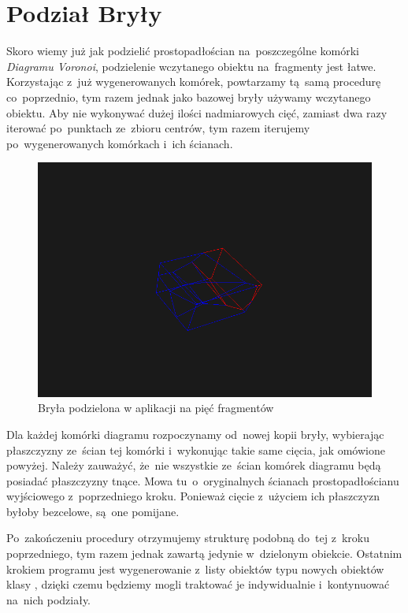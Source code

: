 \documentclass[skorowidz,autorrok,backref,xodstep,oswiadczenie]{wmimgr}
\begin{document}
\section{Podział Bryły}

Skoro wiemy już jak podzielić prostopadłościan na~poszczególne komórki \emph{Diagramu Voronoi}, podzielenie wczytanego obiektu na~fragmenty jest łatwe. Korzystając z~już wygenerowanych komórek, powtarzamy tą~samą procedurę co~poprzednio, tym razem jednak jako bazowej bryły używamy wczytanego obiektu. Aby nie wykonywać dużej ilości nadmiarowych cięć, zamiast dwa razy iterować po~punktach ze~zbioru centrów, tym razem iterujemy po~wygenerowanych komórkach i~ich ścianach.

\begin{figure}[ht!]
\centering
\includegraphics[width=140mm]{images/app3.png}
\caption{Bryła podzielona w aplikacji na pięć fragmentów}
\label{newpointposition}
\end{figure}

Dla każdej komórki diagramu rozpoczynamy od~nowej kopii bryły, wybierając płaszczyzny ze~ścian tej komórki i~wykonując takie same cięcia, jak omówione powyżej. Należy zauważyć, że~nie wszystkie ze~ścian komórek diagramu będą posiadać płaszczyzny tnące. Mowa tu~o~oryginalnych ścianach prostopadłościanu wyjściowego z~poprzedniego kroku. Ponieważ cięcie z~użyciem ich płaszczyzn byłoby bezcelowe, są~one pomijane.

Po~zakończeniu procedury otrzymujemy strukturę podobną do~tej z~kroku poprzedniego, tym razem jednak zawartą jedynie w~dzielonym obiekcie. Ostatnim krokiem programu jest wygenerowanie z~listy obiektów typu  nowych obiektów klasy , dzięki czemu będziemy mogli traktować je indywidualnie i~kontynuować na~nich podziały.
\end{document}
